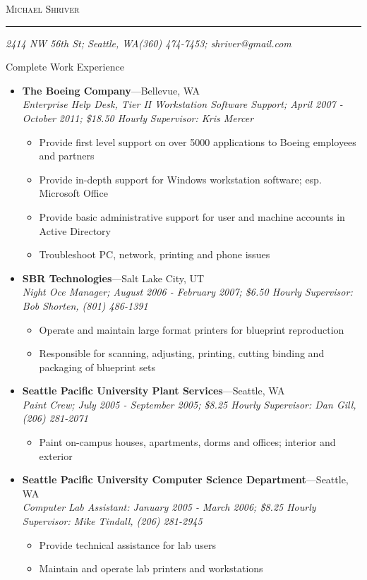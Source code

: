 \documentclass[11pt,oneside]{article}
\makeatletter
\newcommand{\name}{Michael Shriver}
\newcommand{\addr}{2414 NW 56th St; Seattle, WA}
\newcommand{\phone}{(360) 474-7453}
\newcommand{\email}{shriver@gmail.com}
\newcommand{\bigname}[1]{
	\begin{flushleft}\fontfamily{phv}\selectfont\Huge\scshape#1\end{flushleft}
}
\newenvironment{ressection}[1]{
	\vspace{4pt}
	{\fontfamily{phv}\selectfont\Large#1}
	\begin{itemize}
	\vspace{3pt}
}{
	\end{itemize}
}
\newcommand{\ressubitem}[1]{
	\vspace{-1pt}
	\item \begin{flushleft} #1 \end{flushleft}
}
\newenvironment{ressubsec}[4]{
	\item
	\textbf{#1}---#2 \\
	\textit{#3}
	\newline
	\textit{#4}
	\vspace{-2pt}
	\begin{itemize}
}{
	\end{itemize}
}
\makeatother
\begin{document}
 \selectfont

\bigname{\name}
\vspace{-8pt} \rule{\textwidth}{1pt}

\vspace{-1pt} {\small\itshape \addr \hfill \phone; \email}

\vspace{8 pt}


\begin{ressection}{Complete Work Experience}

	\begin{ressubsec}{The Boeing Company}{Bellevue, WA}{Enterprise Help Desk, Tier II Workstation Software Support; April 2007 - October 2011; \$18.50 Hourly}{Supervisor: Kris Mercer}
		\ressubitem{Provide first level support on over 5000 applications to Boeing employees and partners}
		\ressubitem{Provide in-depth support for Windows workstation software; esp. Microsoft Office}
		\ressubitem{Provide basic administrative support for user and machine accounts in Active Directory}
		\ressubitem{Troubleshoot PC, network, printing and phone issues}	
	\end{ressubsec}

	\begin{ressubsec}{SBR Technologies}{Salt Lake City, UT}{Night Oce Manager; August 2006 - February 2007; \$6.50 Hourly}{Supervisor: Bob Shorten, (801) 486-1391}
		\ressubitem{Operate and maintain large format printers for blueprint reproduction}
		\ressubitem{Responsible for scanning, adjusting, printing, cutting binding and packaging of blueprint sets}
	\end{ressubsec}

	\begin{ressubsec}{Seattle Pacific University Plant Services}{Seattle, WA}{Paint Crew; July 2005 - September 2005; \$8.25 Hourly}{Supervisor: Dan Gill, (206) 281-2071}
		\ressubitem{Paint on-campus houses, apartments, dorms and offices; interior and exterior}
	\end{ressubsec}

	\begin{ressubsec}{Seattle Pacific University Computer Science Department}{Seattle, WA}{Computer Lab Assistant: January 2005 - March 2006; \$8.25 Hourly}{Supervisor: Mike Tindall, (206) 281-2945}
		\ressubitem{Provide technical assistance for lab users}
		\ressubitem{Maintain and operate lab printers and workstations}
	\end{ressubsec}


\end{ressection}
\end{document}
